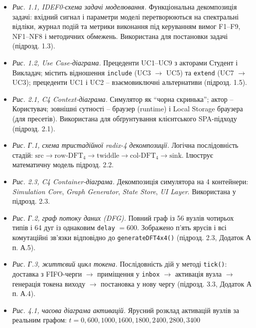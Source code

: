 \documentclass[
]{article}
\newcommand{\passthrough}[1]{#1}
\begin{document}
\begin{itemize}
\item
  \emph{Рис. 1.1, IDEF0-схема задачі моделювання.} Функціональна
  декомпозиція задачі: вхідний сигнал і параметри моделі перетворюються
  на спектральні відліки, журнал подій та метрики виконання під
  керуванням вимог F1--F9, NF1--NF8 і методичних обмежень. Використана
  для постановки задачі (підрозд. 1.3).
\item
  \emph{Рис. 1.2, Use Case-діаграма.} Прецеденти UC1--UC9 з акторами
  Студент і Викладач; містить відношення
  \passthrough{\lstinline!include!} (UC3 \(\rightarrow\) UC5) та
  \passthrough{\lstinline!extend!} (UC7 \(\rightarrow\) UC3); прецеденти
  UC1 і UC2 -- взаємовиключні альтернативи (підрозд. 1.5).
\item
  \emph{Рис. 2.1, C4 Context-діаграма.} Симулятор як ``чорна скринька'';
  актор -- Користувач; зовнішні сутності -- браузер (runtime) і Local
  Storage браузера (для пресетів). Використана для обґрунтування
  клієнтського SPA-підходу (підрозд. 2.1).
\item
  \emph{Рис. Г.1, схема тристадійної radix-4 декомпозиції.} Логічна
  послідовність стадій:
  \(\text{src} \rightarrow \text{row-DFT}_{4} \rightarrow \text{twiddle} \rightarrow \text{col-DFT}_{4} \rightarrow \text{sink}\).
  Ілюструє математичну модель підрозд. 2.2.
\item
  \emph{Рис. 2.3, C4 Container-діаграма.} Декомпозиція симулятора на 4
  контейнери: \emph{Simulation Core}, \emph{Graph Generator},
  \emph{State Store}, \emph{UI Layer}. Використана у підрозд. 2.3.
\item
  \emph{Рис. Г.2, граф потоку даних (DFG).} Повний граф із 56 вузлів
  чотирьох типів і 64 дуг із однаковим \passthrough{\lstinline!delay!}
  \(= 600\). Зображено п'ять ярусів і всі комутаційні зв'язки відповідно
  до
  \passthrough{\lstinline!generateDFT!}\passthrough{\lstinline!4!}\passthrough{\lstinline!x!}\passthrough{\lstinline!4()!}
  (підрозд. 2.3, Додаток А п. А.5).
\item
  \emph{Рис. Г.3, життєвий цикл токена.} Послідовність дій у методі
  \passthrough{\lstinline!tick!}\passthrough{\lstinline!()!}: доставка з
  FIFO-черги \(\rightarrow\) приміщення у
  \passthrough{\lstinline!inbox!} \(\rightarrow\) активація вузла
  \(\rightarrow\) генерація токена виходу \(\rightarrow\) постановка у
  нову чергу (підрозд. 3.3, Додаток А п. А.4).
\item
  \emph{Рис. 4.1, часова діаграма активацій.} Ярусний розклад активацій
  вузлів за реальним графом: \(t = 0,600,1000,1600,1800,2400,2800,3400\)

\end{itemize}
\end{document}
